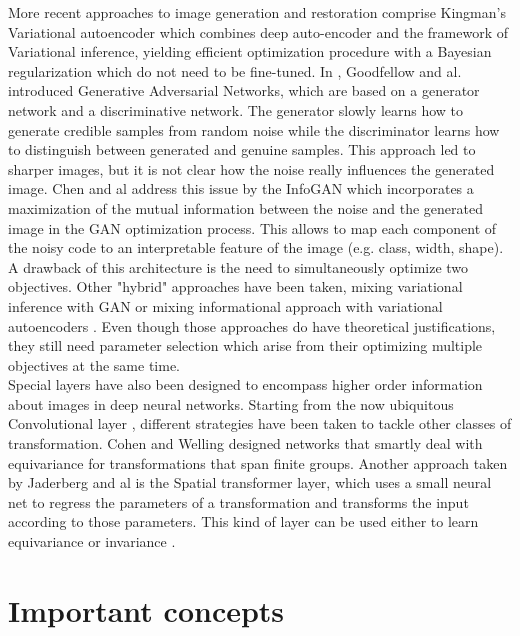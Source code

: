 \documentclass[letterpaper, twoside]{article}
\begin{document}
    More recent approaches to image generation and restoration comprise Kingman's Variational autoencoder \cite{Kingma.aevb} which combines deep auto-encoder and the framework of Variational inference, yielding efficient optimization procedure with a Bayesian regularization which do not need to be fine-tuned. In \cite{Goodfellow.gan}, Goodfellow and al. introduced Generative Adversarial Networks, which are based on a generator network and a discriminative network. The generator slowly learns how to generate credible samples from random noise while the discriminator learns how to distinguish between generated and genuine samples. This approach led to sharper images, but it is not clear how the noise really influences the generated image. Chen and al address this issue by the InfoGAN \cite{chen.infogan} which incorporates a maximization of the mutual information between the noise and the generated image in the GAN optimization process. This allows to map each component of the noisy code to an interpretable feature of the image (e.g. class, width, shape). A drawback of this architecture is the need to simultaneously optimize two objectives. Other "hybrid" approaches have been taken, mixing variational inference with GAN \cite{Mescheder.advvae} or mixing informational approach with variational autoencoders \cite{Zhao.infoVAE}. Even though those approaches do have theoretical justifications, they still need parameter selection which arise from their optimizing multiple objectives at the same time.\\

    Special layers have also been designed to encompass higher order information about images in deep neural networks. Starting from the now ubiquitous Convolutional layer \cite{lecun-gradientbased-learning-applied-1998}, different strategies have been taken to tackle other classes of transformation. Cohen and Welling \cite{cohen.groupequi} designed networks that smartly deal with equivariance for transformations that span finite groups. Another approach taken by Jaderberg and al \cite{Jaderberg.stn} is the Spatial transformer layer, which uses a small neural net to regress the parameters of a transformation and transforms the input according to those parameters. This kind of layer can be used either to learn equivariance or invariance \cite{Jaderberg.stn}.

\section{Important concepts}
\end{document}
